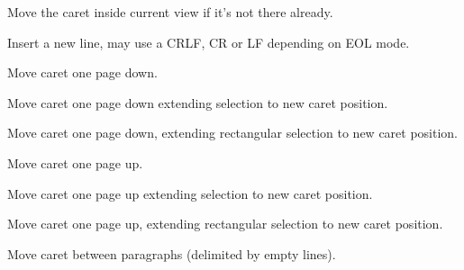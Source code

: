 \label{wxstyledtextctrlmovecaretinsideview}


Move the caret inside current view if it's not there already.


\label{wxstyledtextctrlnewline}


Insert a new line, may use a CRLF, CR or LF depending on EOL mode.


\label{wxstyledtextctrlpagedown}


Move caret one page down.


\label{wxstyledtextctrlpagedownextend}


Move caret one page down extending selection to new caret position.


\label{wxstyledtextctrlpagedownrectextend}


Move caret one page down, extending rectangular selection to new caret position.


\label{wxstyledtextctrlpageup}


Move caret one page up.


\label{wxstyledtextctrlpageupextend}


Move caret one page up extending selection to new caret position.


\label{wxstyledtextctrlpageuprectextend}


Move caret one page up, extending rectangular selection to new caret position.


\label{wxstyledtextctrlparadown}


Move caret between paragraphs (delimited by empty lines).


